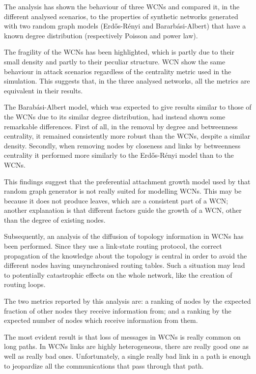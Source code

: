 \documentclass[a4paper,11pt,twoside,openright]{memoir}
\begin{document}
The analysis has shown the behaviour of three WCNs and compared it, in the
different analysed scenarios, to the properties of synthetic networks
generated with two random graph models (Erd\H{o}s-Rényi and Bararbási-Albert)
that have a known degree distribution (respectively Poisson and power law).

The fragility of the WCNs has been highlighted, which is partly due
to their small density and partly to their peculiar structure. WCN show the
same behaviour in attack scenarios regardless of the centrality metric used
in the simulation. This suggests that, in the three analysed
networks, all the metrics are equivalent in their results.

The Barabási-Albert model, which was expected to give results similar to
those of the WCNs due to its similar degree distribution, had instead shown
some remarkable differences. First of all, in the removal by degree and
betweenness centrality, it remained consistently more robust than the WCNs,
despite a similar density. Secondly, when removing nodes by closeness and
links by betweenness centrality it performed more similarly to the
Erd\H{o}s-Rényi model than to the WCNs.

This findings suggest that the preferential attachment growth model used by
that random graph generator is not really suited for modelling WCNs.
This may be because it does not produce leaves, which are a consistent part
of a WCN; another explanation is that different factors guide the growth of
a WCN, other than the degree of existing nodes.

Subsequently, an analysis of the diffusion of topology information in WCNs
has been performed. Since they use a link-state routing protocol, the correct
propagation of the knowledge about the topology is central in order to avoid
the different nodes having unsynchronised routing tables. Such a situation
may lead to potentially catastrophic effects on the whole network, like the
creation of routing loops.

The two metrics reported by this analysis are: a ranking of nodes by the expected
fraction of other nodes they receive information from; and a ranking by the
expected number of nodes which receive information from them.

The most evident result is that loss
of messages in WCNs is really common on long paths. In WCNs links are highly
heterogeneous, there are really good one as well as really bad ones.
Unfortunately, a single really bad link in a path is enough to jeopardize
all the communications that pass through that path.
\end{document}
